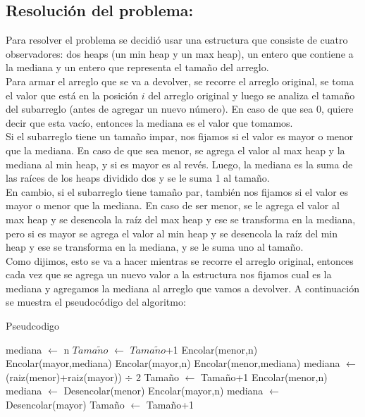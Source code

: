 \documentclass[10pt, a4paper]{article}
\begin{document}
		\subsection{Resoluci\'on del problema:}
		Para resolver el problema se decidi\'o usar una estructura que consiste de cuatro observadores: dos heaps (un min heap y un max heap), un entero que contiene a la mediana y un entero que representa el tamaño del arreglo.
		\\ Para armar el arreglo que se va a devolver, se recorre el arreglo original, se toma el valor que est\'a en la posici\'on $i$ del arreglo original y luego se analiza el tama\~no del subarreglo (antes de agregar un nuevo n\'umero). En caso de que sea 0, quiere decir que esta vac\'io, entonces la mediana es el valor que tomamos.
		\\Si el subarreglo tiene un tama\~no impar, nos fijamos si el valor es mayor o menor que la mediana. En caso de que sea menor, se agrega el valor al max heap y la mediana al min heap, y si es mayor es al rev\'es. Luego, la mediana es la suma de las ra\'ices de los heaps dividido dos y se le suma 1 al tama\~no.
		\\En cambio, si el subarreglo tiene tama\~no par, tambi\'en nos fijamos si el valor es mayor o menor que la mediana. En caso de ser menor, se le agrega el valor al max heap y se desencola la ra\'iz del max heap y ese se transforma en la mediana, pero si es mayor se agrega el valor al min heap y se desencola la ra\'iz del min heap y ese se transforma en la mediana, y se le suma uno al tama\~no.
		\\Como dijimos, esto se va a hacer mientras se recorre el arreglo original, entonces cada vez que se agrega un nuevo valor a la estructura nos fijamos cual es la mediana y agregamos la mediana al arreglo que vamos a devolver.
		A continuación se muestra el pseudocódigo del  algoritmo:
		

		\begin{algorithm}
			\caption{Pseudcodigo}
			\begin{algorithmic}[1]
				
					\STATE mediana $\leftarrow$ n
					\STATE $Tama\tilde{n}o$ $\leftarrow$ $Tama\tilde{n}o$+1
					\STATE Encolar(menor,n)
					\STATE Encolar(mayor,mediana)
					\ELSE 
					\STATE Encolar(mayor,n)
					\STATE Encolar(menor,mediana)
					\ENDIF
					\STATE mediana $\leftarrow$ (raiz(menor)+raiz(mayor)) $\div$ 2
					\STATE Tama\~no $\leftarrow$ Tama\~no+1
				\ELSE
					\STATE Encolar(menor,n)
					\STATE mediana $\leftarrow$ Desencolar(menor)
					\ELSE 
					\STATE Encolar(mayor,n)
					\STATE mediana $\leftarrow$ Desencolar(mayor)
					\ENDIF
					\STATE Tama\~no $\leftarrow$ Tama\~no+1
				\ENDIF										
			\end{algorithmic}
		\end{algorithm}
		
\end{document}
